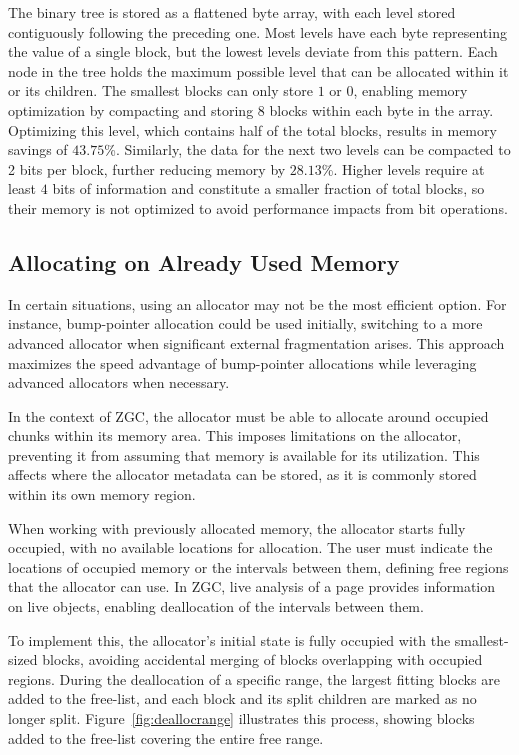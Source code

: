 The binary tree is stored as a flattened byte array, with each level stored contiguously following the preceding one. Most levels have each byte representing the value of a single block, but the lowest levels deviate from this pattern. Each node in the tree holds the maximum possible level that can be allocated within it or its children. The smallest blocks can only store $1$ or $0$, enabling memory optimization by compacting and storing 8 blocks within each byte in the array. Optimizing this level, which contains half of the total blocks, results in memory savings of $43.75$\%. Similarly, the data for the next two levels can be compacted to 2 bits per block, further reducing memory by $28.13$\%. Higher levels require at least $4$ bits of information and constitute a smaller fraction of total blocks, so their memory is not optimized to avoid performance impacts from bit operations.

\newpage
\subsection{Allocating on Already Used Memory} \label{sec:freerangeexpl}
In certain situations, using an allocator may not be the most efficient option. For instance, bump-pointer allocation could be used initially, switching to a more advanced allocator when significant external fragmentation arises. This approach maximizes the speed advantage of bump-pointer allocations while leveraging advanced allocators when necessary.

In the context of ZGC, the allocator must be able to allocate around occupied chunks within its memory area. This imposes limitations on the allocator, preventing it from assuming that memory is available for its utilization. This affects where the allocator metadata can be stored, as it is commonly stored within its own memory region.

When working with previously allocated memory, the allocator starts fully occupied, with no available locations for allocation. The user must indicate the locations of occupied memory or the intervals between them, defining free regions that the allocator can use. In ZGC, live analysis of a page provides information on live objects, enabling deallocation of the intervals between them.

To implement this, the allocator's initial state is fully occupied with the smallest-sized blocks, avoiding accidental merging of blocks overlapping with occupied regions. During the deallocation of a specific range, the largest fitting blocks are added to the free-list, and each block and its split children are marked as no longer split. Figure~\ref{fig:deallocrange} illustrates this process, showing blocks added to the free-list covering the entire free range.

